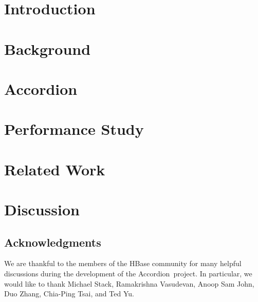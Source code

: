 \documentclass{vldb}
\newcommand{\sys}{Accordion}
\begin{document}

\section{Introduction} \label{sec:intro}
 

\section{Background} \label{sec:background}
 

\section{\sys} \label{sec:accordion}
 

\section{Performance Study} \label{sec:eval}



\section{Related Work} \label{sec:related}


\section{Discussion} \label{sec:conclusions}


\subsection*{Acknowledgments}

We are thankful to the members of the HBase community for many helpful discussions during the development of the \sys\ project. In particular, we would like to thank Michael Stack, Ramakrishna Vasudevan, Anoop Sam John, Duo Zhang, Chia-Ping Tsai, and Ted Yu.





\end{document}
